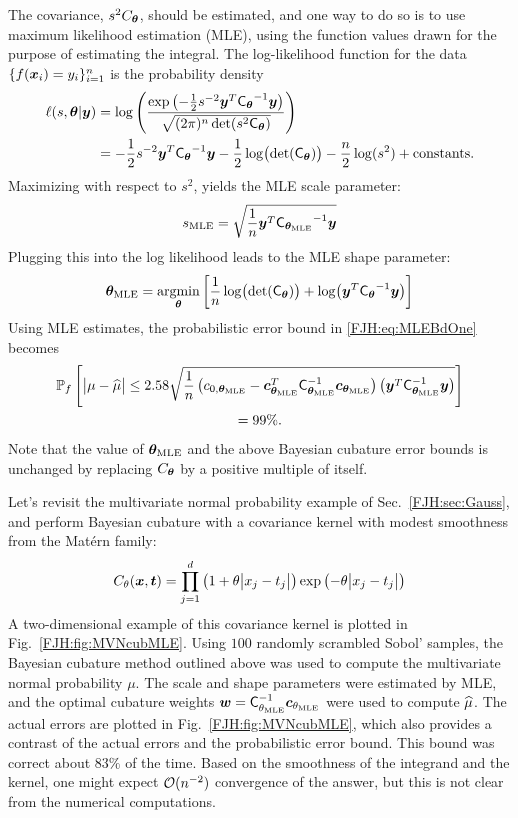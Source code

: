 \documentclass[graybox,footinfo]{svmult}
\begin{document}
The covariance, $s^2 C_{{\boldsymbol{\theta}}}$, should be estimated, and one way to do so is to use 
maximum likelihood estimation (MLE), using the function values drawn for the purpose of 
estimating the integral.  The log-likelihood function for the data $ \{f({\boldsymbol{x}}_i )= 
y_i\}_{i=1}^n$ is the probability density
\begin{align*}
\ell(s,{\boldsymbol{\theta}} | {\boldsymbol{y}}) & = \log \left(\frac{\exp\left(- \frac 12 s^{-2} {\boldsymbol{y}}^T 
\mathsf{C_{{\boldsymbol{\theta}}}}^{-1} {\boldsymbol{y}}\right)}{\sqrt{(2\pi)^n  \det(s^2 
\mathsf{C_{{\boldsymbol{\theta}}}})}}\right)\\
& = - \frac 12 s^{-2} {\boldsymbol{y}}^T \mathsf{C_{{\boldsymbol{\theta}}}}^{-1} {\boldsymbol{y}} -\frac 12  
\log \bigl(
\det(\mathsf{C_{{\boldsymbol{\theta}}}}) \bigr) - \frac n2 \log(s^2) + \text{constants}.
\end{align*}
Maximizing with respect to $s^2$, yields the MLE scale parameter:
\[
s_{\text{MLE}} =  \sqrt{\frac 1n {\boldsymbol{y}}^T \mathsf{C_{{\boldsymbol{\theta}}_{\text{MLE}}}}^{-1} {\boldsymbol{y}}}
\]
Plugging this into the log likelihood leads to the MLE shape parameter: 
\[
{\boldsymbol{\theta}}_{\text{MLE}} =  \operatorname*{argmin}_{\boldsymbol{\theta}} \left[\frac 1n \log \bigl(\det(\mathsf{C_{{\boldsymbol{\theta}}}}) 
\bigr) 
+ \log\bigl({\boldsymbol{y}}^T \mathsf{C_{{\boldsymbol{\theta}}}}^{-1} {\boldsymbol{y}} \bigr)  \right ]
\]
Using MLE estimates, the probabilistic error 
bound in \eqref{FJH:eq:MLEBdOne} becomes
\begin{multline} \label{FJH:eq:MLEBdTwo}
\bbP_f\left[\abs{\mu - \hmu} \le 2.58 
\sqrt{\frac 1n \left(c_{0,\bstheta_\MLE} - \bsc_{\bstheta_\MLE} ^T 
	\mC_{\bstheta_\MLE}^{-1} \bsc_{\bstheta_\MLE} \right)  \left(\bsy^T 
	\mathsf{C}_{\bstheta_\MLE}^{-1} \bsy\right)}\right] \\
 = 99\%.
\end{multline}
Note that the value of ${\boldsymbol{\theta}}_{\text{MLE}}$ and the above Bayesian cubature error bounds  
is unchanged by replacing  $C_{\boldsymbol{\theta}}$ by a positive multiple of itself.  

Let's revisit the multivariate normal probability example of Sec.\ \ref{FJH:sec:Gauss}, 
and perform Bayesian cubature with a covariance kernel with modest smoothness from 
the Mat\'ern  family:
\begin{equation} \label{FJH:eq:Matern}
C_\theta(\bsx,\bst) = \prod_{j=1}^d \left(1 + 
\theta\abs{x_j-t_j}\right) \exp\left(-\theta\abs{x_j-t_j}\right)
\end{equation}
A two-dimensional example of this covariance kernel is plotted in Fig.\ 
\ref{FJH:fig:MVNcubMLE}.  Using $100$ randomly scrambled Sobol' samples, the 
Bayesian 
cubature method outlined above was used to compute the multivariate normal probability 
$\mu$.  The scale and shape parameters were estimated by MLE, and the optimal 
cubature weights ${\boldsymbol{w}} = 
\mathsf{C}_{\theta_{\text{MLE}}}^{-1} {\boldsymbol{c}}_{\theta_{\text{MLE}}}$ were used to compute $\widehat{\mu}$.  
The actual errors are plotted in Fig.\ \ref{FJH:fig:MVNcubMLE}, which also provides a 
contrast of the actual errors and the probabilistic error bound.  This bound was correct 
about $83\%$ of the time.  Based on the smoothness of the integrand and the kernel, 
one might expect ${\mathcal{O}}(n^{-2})$ convergence of the answer, but this is not clear from 
the numerical computations.
\end{document}
